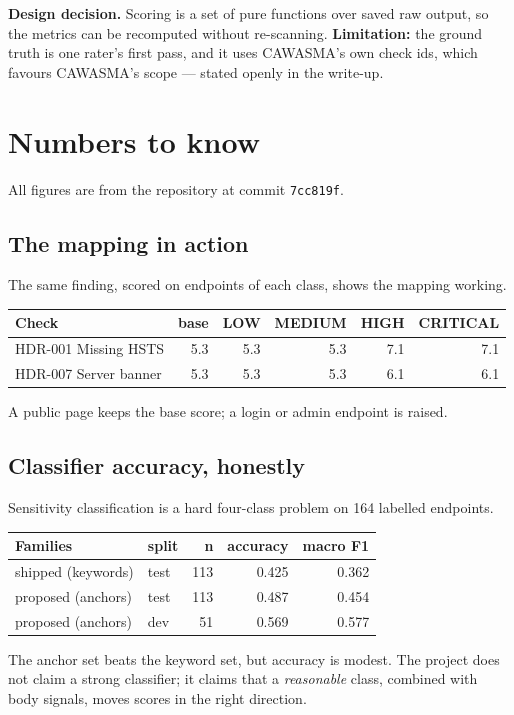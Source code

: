 \textbf{Design decision.} Scoring is a set of pure functions over saved raw
output, so the metrics can be recomputed without re-scanning.
\textbf{Limitation:} the ground truth is one rater's first pass, and it uses
CAWASMA's own check ids, which favours CAWASMA's scope --- stated openly in the
write-up.

\section{Numbers to know}
All figures are from the repository at commit \texttt{7cc819f}.

\subsection{The mapping in action}
The same finding, scored on endpoints of each class, shows the mapping
working.
\begin{center}\small
\begin{tabular}{@{}lrrrrr@{}}
\toprule
Check & base & LOW & MEDIUM & HIGH & CRITICAL\\
\midrule
HDR-001 Missing HSTS & 5.3 & 5.3 & 5.3 & 7.1 & 7.1\\
HDR-007 Server banner & 5.3 & 5.3 & 5.3 & 6.1 & 6.1\\
\bottomrule
\end{tabular}
\end{center}
A public page keeps the base score; a login or admin endpoint is raised.

\subsection{Classifier accuracy, honestly}
Sensitivity classification is a hard four-class problem on 164 labelled
endpoints.
\begin{center}\small
\begin{tabular}{@{}llrrr@{}}
\toprule
Families & split & n & accuracy & macro F1\\
\midrule
shipped (keywords) & test & 113 & 0.425 & 0.362\\
proposed (anchors) & test & 113 & 0.487 & 0.454\\
proposed (anchors) & dev & 51 & 0.569 & 0.577\\
\bottomrule
\end{tabular}
\end{center}
The anchor set beats the keyword set, but accuracy is modest. The project does
not claim a strong classifier; it claims that a \emph{reasonable} class, combined
with body signals, moves scores in the right direction.


